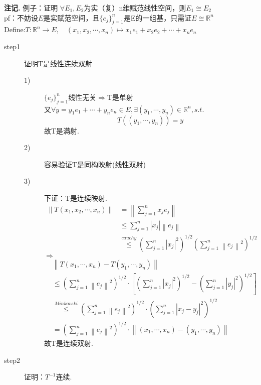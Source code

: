 \documentclass[12pt, a4paper, oneside]{ctexbook}
\newenvironment{note}{\par\noindent\textbf{注记. }}{\par}
\begin{document}
\begin{note}
例子：证明	$\forall E_1,E_2$为实（复）n维赋范线性空间，则$E_1\cong E_2$\\
	pf：不妨设$E$是实赋范空间，且$\{e_j\}_{j=1}^n$是E的一组基，只需证$E\cong \mathbb{R}^n$\\
	Define:$T:\mathbb{R}^n \to E,\quad (x_1,x_2,\cdots,x_n)\mapsto x_1e_1+x_2e_2+\cdots +x_ne_n$\begin{description}
		\item[step1] 证明T是线性连续双射\begin{description}
			\item[1)] $\{e_j\}_{j=1}^n$线性无关$\Rightarrow $T是单射\\
			又$\forall y=y_1e_1+\cdots +y_ne_n\in E,\exists (y_1,\cdots,y_n)\in \mathbb{R}^n,s.t.$\begin{equation*}
				T\left((y_1,\cdots ,y_n)\right)=y
			\end{equation*}
		故T是满射.
		\item[2)] 容易验证T是同构映射(线性双射)
		\item[3)] 下证：T是连续映射.\\
		\begin{align*}
			\left \| T(x_1,x_2,\cdots ,x_n)\right \|
			&=\left \| \sum_{j=1}^{n}x_je_j\right \|\\
			&\leqslant \sum_{j=1}^{n}\left | x_j\right |\left \| e_j\right \|\\
			&\overset{cauchy}{\leqslant }\left ( \sum_{j=1}^{n}\left | x_j\right |^2\right )^{1/2}\left ( \sum_{j=1}^{n}\left \| e_j\right \|^2\right )^{1/2}
		\end{align*}
	$\Rightarrow $\begin{align*}
		&\left \| T(x_1,\cdots,x_n)-T(y_1,\cdots,y_n)\right \|\\
		& \leqslant \left ( \sum_{j=1}^{n}\left \| e_j\right \|^2\right )^{1/2}\cdot \left [ \left ( \sum_{j=1}^{n}\left | x_j\right |^2\right )^{1/2}-\left ( \sum_{j=1}^{n}\left | y_j\right |^2\right )^{1/2}\right ]\\
		&\overset{Minkovski}{\leqslant }\left ( \sum_{j=1}^{n}\left \| e_j\right \|^2\right )^{1/2}\cdot \left ( \sum_{j=1}^{n}\left | x_j-y_j\right |^2\right )^{1/2}\\
		&=\left ( \sum_{j=1}^{n}\left \| e_j\right \|^2\right )^{1/2}\cdot \left \| (x_1,\cdots,x_n)-(y_1,\cdots ,y_n)\right \|
	\end{align*}
故T是连续双射.
		\end{description}
	\item[step2] 证明：$T^{-1}$连续.\\

\end{description}
\end{note}
\end{document}
